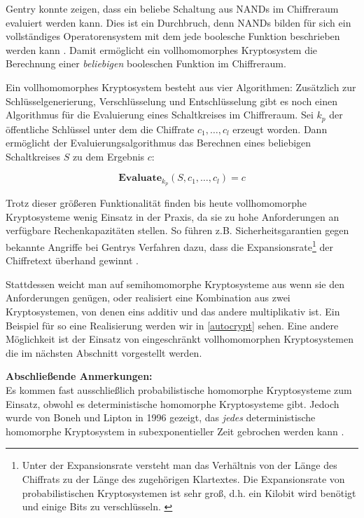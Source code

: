 Gentry konnte zeigen, dass ein beliebe Schaltung aus NANDs im Chiffreraum evaluiert werden kann. Dies ist ein Durchbruch, denn NANDs bilden für sich ein vollständiges Operatorensystem mit dem jede boolesche Funktion beschrieben werden kann \cite[p.129]{hoffmann2010grundlagen}. Damit ermöglicht ein vollhomomorphes Kryptosystem die Berechnung einer \textit{beliebigen} booleschen Funktion im Chiffreraum.

Ein vollhomomorphes Kryptosystem besteht aus vier Algorithmen: Zusätzlich zur Schlüsselgenerierung, Verschlüsselung und Entschlüsselung gibt es noch einen Algorithmus für die Evaluierung eines Schaltkreises im Chiffreraum. Sei $k_p$ der öffentliche Schlüssel unter dem die Chiffrate $c_1,\ldots,c_l$ erzeugt worden. Dann ermöglicht der Evaluierungsalgorithmus das Berechnen eines beliebigen Schaltkreises $S$ zu dem Ergebnis $c$:

\begin{equation*}
\textbf{Evaluate}_{k_p}(S,c_1,\ldots,c_l) = c
\end{equation*}

Trotz dieser größeren Funktionalität finden bis heute vollhomomorphe Kryptosysteme wenig Einsatz in der Praxis, da sie zu hohe Anforderungen an verfügbare Rechenkapazitäten stellen. So führen z.B. Sicherheitsgarantien gegen bekannte Angriffe bei Gentrys Verfahren dazu, dass die Expansionsrate\footnote{Unter der Expansionsrate versteht man das Verhältnis von der Länge des Chiffrats zu der Länge des zugehörigen Klartextes. Die Expansionsrate von probabilistischen Kryptosystemen ist sehr groß, d.h. ein Kilobit wird benötigt und einige Bits zu verschlüsseln. \cite[p.3+10]{naccache1998new}} der Chiffretext überhand gewinnt \cite[p.49]{yi2014homomorphic}.

Stattdessen weicht man auf semihomomorphe Kryptosysteme aus wenn sie den Anforderungen genügen, oder realisiert eine Kombination aus zwei Kryptosystemen, von denen eins additiv und das andere multiplikativ ist. Ein Beispiel für so eine Realisierung werden wir in \ref{autocrypt} sehen. Eine andere Möglichkeit ist der Einsatz von eingeschränkt vollhomomorphen Kryptosystemen die im nächsten Abschnitt vorgestellt werden.

\textbf{Abschließende Anmerkungen:}\\
Es kommen fast ausschließlich probabilistische homomorphe Kryptosysteme zum Einsatz, obwohl es deterministische homomorphe Kryptosysteme gibt. Jedoch wurde von Boneh und Lipton in 1996 gezeigt, das \textit{jedes} deterministische homomorphe Kryptosystem in subexponentieller Zeit gebrochen werden kann \cite{boneh1996algorithms}. 

